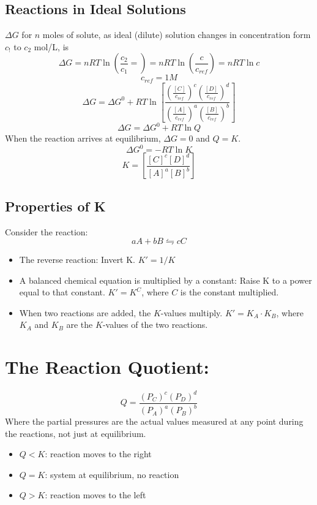 \documentclass[10pt]{article}
\begin{document}
\subsection*{Reactions in Ideal Solutions}
$\Delta G$ for $n$ moles of solute, as ideal (dilute) solution changes in concentration form $c_!$ to $c_2$ mol/L, is
\[\Delta G = nRT \ln \left(\frac{c_2}{c_1} =\right) = nRT \ln \left( \frac{c}{c_{ref}}\right) = nRT \ln c\]
\[c_{ref} = 1 M\]
\[\Delta G = \Delta G^0 + RT \ln \left[\frac{\left(\frac{[C]}{c_{ref}}\right)^c\left(\frac{[D]}{c_{ref}}\right)^d}{\left(\frac{[A]}{c_{ref}}\right)^a \left(\frac{[B]}{c_{ref}}\right)^b}\right]\]
\[\Delta G = \Delta G^0 + RT \ln Q\]
When the reaction arrives at equilibrium, $\Delta G = 0$ and $Q = K$.
\[\Delta G^0 = -RT \ln K\]
\[K = \left[\frac{[C]^c[D]^d}{[A]^a[B]^b}\right]\]

\subsection*{Properties of K}
Consider the reaction:
\[aA + bB \leftrightharpoons cC\]
\begin{itemize}
    \item The reverse reaction: Invert K.  $K' = 1 / K$
    \item A balanced chemical equation is multiplied by a constant: Raise K to a power equal to that constant. $K' = K^C$, where $C$ is the constant multiplied.
    \item When two reactions are added, the $K$-values multiply.  $K' = K_A \cdot K_B$, where $K_A$ and $K_B$ are the $K$-values of the two reactions.
\end{itemize}

\section*{The Reaction Quotient:}
\[Q = \frac{(P_C)^c (P_D)^d}{(P_A)^a (P_B)^b}\]
Where the partial pressures are the actual values measured at any point during the reactions, not just at equilibrium.
\begin{itemize}
    \item $Q < K$: reaction moves to the right
    \item $Q = K$: system at equilibrium, no reaction
    \item $Q > K$: reaction moves to the left
\end{itemize}
\end{document}
